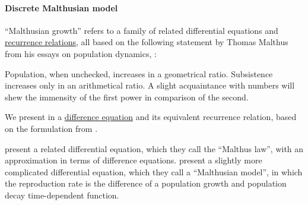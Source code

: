 \paragraph{Discrete Malthusian model}

\begin{remark}\label{rem:malthusian_growth}
  \enquote{Malthusian growth} refers to a family of related differential equations and \hyperref[def:recurrence_relation]{recurrence relations}, all based on the following statement by Thomas Malthus from his essays on population dynamics, :
  \begin{displayquote}
    Population, when unchecked, increases in a geometrical ratio. Subsistence increases only in an arithmetical ratio. A slight acquaintance with numbers will shew the immensity of the first power in comparison of the second.
  \end{displayquote}

  We present in  a \hyperref[def:difference_equation]{difference equation} and its equivalent recurrence relation, based on the formulation from .

   present a related differential equation, which they call the \enquote{Malthus law}, with an approximation in terms of difference equations.  present a slightly more complicated differential equation, which they call a \enquote{Malthusian model}, in which the reproduction rate is the difference of a population growth and population decay time-dependent function.
\end{remark}


